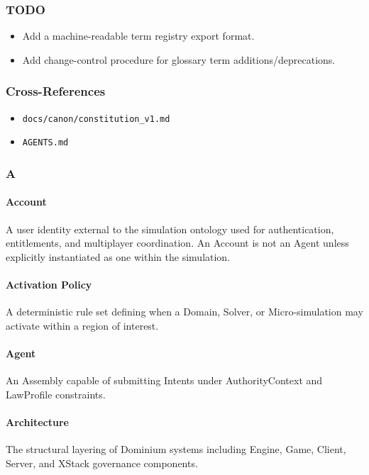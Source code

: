 \documentclass[9pt,a4paper,openany]{book}
\begin{document}
\subsubsection{TODO}
\begin{itemize}
\item Add a machine-\allowbreak{}readable term registry export format.\allowbreak{}
\item Add change-\allowbreak{}control procedure for glossary term additions/\allowbreak{}deprecations.\allowbreak{}
\end{itemize}

\subsubsection{Cross-References}
\begin{itemize}
\item \texttt{docs/\allowbreak{}canon/\allowbreak{}constitution\_\allowbreak{}v1.\allowbreak{}md}
\item \texttt{AGENTS.\allowbreak{}md}
\end{itemize}

\subsubsection{A}

\paragraph{Account}
A user identity external to the simulation ontology used for authentication, entitlements, and multiplayer coordination.\allowbreak{} An Account is not an Agent unless explicitly instantiated as one within the simulation.\allowbreak{}


\paragraph{Activation Policy}
A deterministic rule set defining when a Domain, Solver, or Micro-\allowbreak{}simulation may activate within a region of interest.\allowbreak{}


\paragraph{Agent}
An Assembly capable of submitting Intents under AuthorityContext and LawProfile constraints.\allowbreak{}


\paragraph{Architecture}
The structural layering of Dominium systems including Engine, Game, Client, Server, and XStack governance components.\allowbreak{}
\end{document}
